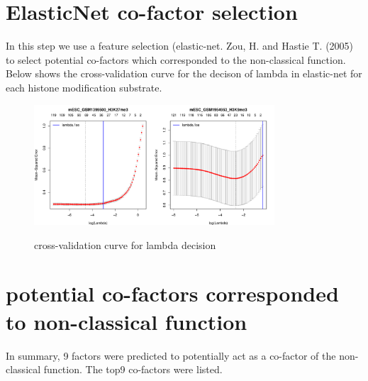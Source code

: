 \documentclass[11pt,a4paper]{article}
\begin{document}
\section{ElasticNet co-factor selection}
In this step we use a feature selection (elastic-net. Zou, H. and Hastie T. (2005) to select potential co-factors which corresponded to the non-classical function. Below shows the cross-validation curve for the decison of lambda in elastic-net for each histone modification substrate.  
\begin{figure}[h]
        \caption{cross-validation curve for lambda decision} \label{fig:profileunion}
        \setlength{\abovecaptionskip}{0pt}
        \setlength{\belowcaptionskip}{10pt}
        \centering
        {\includegraphics[width=0.8\textwidth]{test8_elnet_lambdaSelection.pdf}}
\end{figure}

\newpage
\newpage
\section{potential co-factors corresponded to non-classical function}
In summary, 9 factors were predicted to potentially act as a co-factor of the non-classical function. The top9 co-factors were listed.
\end{document}
